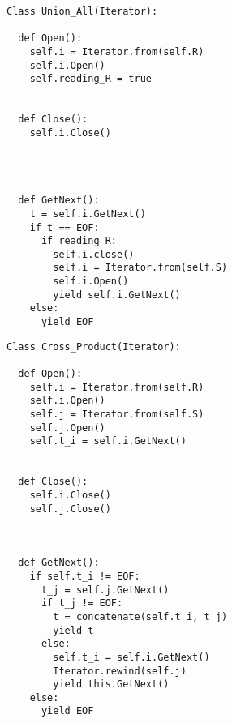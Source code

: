 \newsavebox{\UnionAllIteratorCode}
\begin{lrbox}{\UnionAllIteratorCode}
\begin{minipage}{\textwidth}
\begin{lstlisting}[style=Python,multicols=2]
Class Union_All(Iterator):

  def Open():
    self.i = Iterator.from(self.R)
    self.i.Open()
    self.reading_R = true


  def Close():
    self.i.Close()




  def GetNext():
    t = self.i.GetNext()
    if t == EOF:
      if reading_R: 
        self.i.close()
        self.i = Iterator.from(self.S)
        self.i.Open()
        yield self.i.GetNext()
    else:
      yield EOF
\end{lstlisting}
\end{minipage}
\end{lrbox}




%
%

\newsavebox\CrossProductIterator
\begin{lrbox}{\CrossProductIterator}
\begin{minipage}{\textwidth}
\begin{lstlisting}[style=Python,multicols=2]
Class Cross_Product(Iterator):

  def Open():
    self.i = Iterator.from(self.R)
    self.i.Open()
    self.j = Iterator.from(self.S)
    self.j.Open()
    self.t_i = self.i.GetNext()


  def Close():
    self.i.Close()
    self.j.Close()



  def GetNext():
    if self.t_i != EOF:
      t_j = self.j.GetNext()
      if t_j != EOF:
        t = concatenate(self.t_i, t_j)
        yield t
      else:
        self.t_i = self.i.GetNext()
        Iterator.rewind(self.j)
        yield this.GetNext()
    else:
      yield EOF
\end{lstlisting}
\end{minipage}
\end{lrbox}

